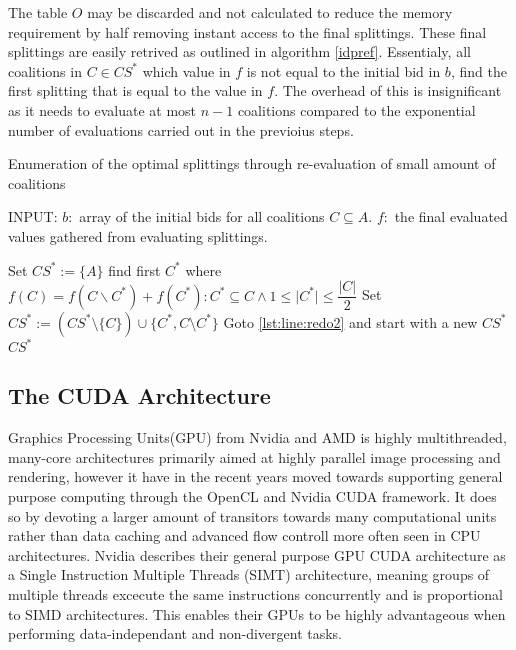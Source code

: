 \documentclass{aamas2012}
\begin{document}
The table $O$ may be discarded and not calculated to reduce the memory requirement by half removing instant access to the final splittings.
These final splittings are easily retrived as outlined in algorithm \ref{idpref}. 
Essentialy, all coalitions in $C \in CS^*$ which value in $f$
is not equal to the initial bid in $b$, find the first splitting that is equal to the value in $f$.
The overhead of this is insignificant as it needs to evaluate at most $n -1$ coalitions compared to the exponential
number of evaluations carried out in the previoius steps\cite{eps265062}.

\begin{algorithm}
\caption{Enumeration of the optimal splittings through re-evaluation of small amount of coalitions \label{idpref}}
INPUT: $b:$ array of the initial bids for all coalitions $C \subseteq A$. 
$f:$ the final evaluated values gathered from evaluating splittings.
\begin{algorithmic}[1]
\STATE Set $CS^* := \{A\}$
 \label{lst:line:redo2}
\STATE find first $C^*$ where $f(C) = f(C\backslash C^*)+f(C^*):C^*\subseteq C \wedge 1 \leq \vert C^* \vert \leq \dfrac{\vert C \vert}{2}$ \label{lst:line:aa}
\STATE Set $CS^* := (CS^*\setminus \{C\})\cup \{C^*,C\setminus C^*\}$
\STATE Goto \ref{lst:line:redo2} and start with a new $CS^*$
\ENDIF
\ENDFOR
\RETURN $CS^*$
\end{algorithmic}
\end{algorithm}



\subsection{The CUDA Architecture} %
Graphics Processing Units(GPU) from Nvidia and AMD is highly multithreaded, many-core architectures primarily aimed at 
highly parallel image processing and rendering, however it have in the recent years moved towards supporting general purpose computing through 
the OpenCL and Nvidia CUDA framework.
It does so by devoting a larger amount of transitors towards many computational units rather than data caching and advanced 
flow controll more often seen in CPU architectures.
Nvidia describes their general purpose GPU CUDA architecture as a Single Instruction Multiple Threads (SIMT) architecture, 
meaning groups of multiple threads excecute the same instructions concurrently and is proportional to SIMD architectures. 
This enables their GPUs to be highly advantageous when performing data-independant and non-divergent tasks.
\end{document}
